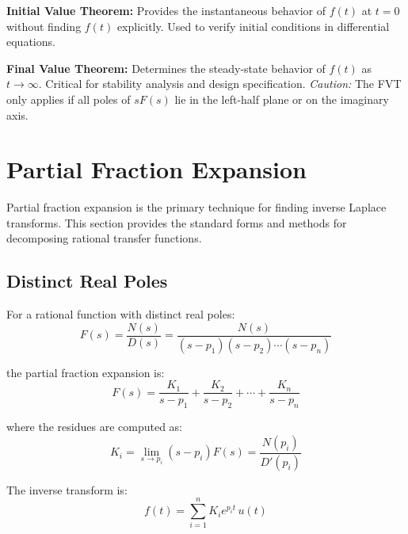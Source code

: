 \begin{warningbox}[title=Important Theorems]
\textbf{Initial Value Theorem:} Provides the instantaneous behavior of $f(t)$ at $t=0$ without finding $f(t)$ explicitly. Used to verify initial conditions in differential equations.

\textbf{Final Value Theorem:} Determines the steady-state behavior of $f(t)$ as $t \to \infty$. Critical for stability analysis and design specification. \textit{Caution:} The FVT only applies if all poles of $sF(s)$ lie in the left-half plane or on the imaginary axis.
\end{warningbox}

\section{Partial Fraction Expansion}
\label{sec:partial_fractions}

Partial fraction expansion is the primary technique for finding inverse Laplace transforms. This section provides the standard forms and methods for decomposing rational transfer functions.

\subsection{Distinct Real Poles}
\label{subsec:distinct_real_poles}

For a rational function with distinct real poles:
\begin{equation}
    F(s) = \frac{N(s)}{D(s)} = \frac{N(s)}{(s-p_1)(s-p_2)\cdots(s-p_n)}
\end{equation}

the partial fraction expansion is:
\begin{equation}
    F(s) = \frac{K_1}{s-p_1} + \frac{K_2}{s-p_2} + \cdots + \frac{K_n}{s-p_n}
\end{equation}

\noindent where the residues are computed as:
\begin{equation}
    K_i = \lim_{s \to p_i} (s - p_i) F(s) = \frac{N(p_i)}{D'(p_i)}
\end{equation}

\noindent The inverse transform is:
\begin{equation}
    f(t) = \sum_{i=1}^{n} K_i e^{p_i t} \, u(t)
\end{equation}

